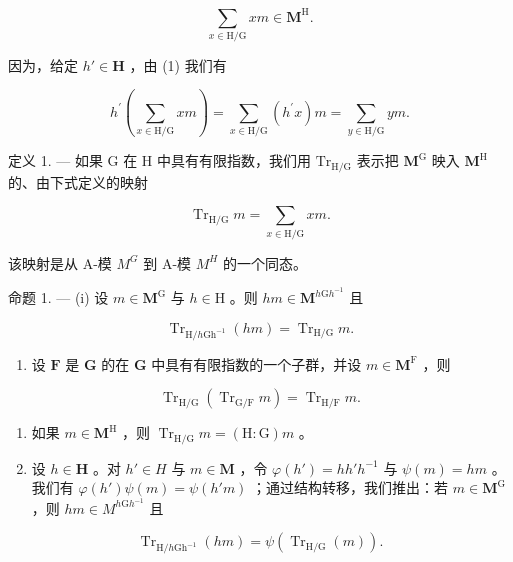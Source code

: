 \[
\sum_ {x \in \mathrm{H} / \mathrm{G}} x m \in \mathbf {M} ^ {\mathrm{H}}.\tag{2}
\]

因为，给定 \(h' \in \mathbf{H}\) ，由 (1) 我们有

\[
h ^ {\prime} \left(\sum_ {x \in \mathrm{H} / \mathrm{G}} x m\right) = \sum_ {x \in \mathrm{H} / \mathrm{G}} \left(h ^ {\prime} x\right) m = \sum_ {y \in \mathrm{H} / \mathrm{G}} y m.
\]

定义 1. --- 如果 G 在 H 中具有有限指数，我们用 \(\mathrm{Tr}_{\mathrm{H}/\mathrm{G}}\) 表示把 \(\mathbf{M}^{\mathrm{G}}\) 映入 \(\mathbf{M}^{\mathrm{H}}\) 的、由下式定义的映射

\[
\operatorname{Tr} _ {\mathrm{H} / \mathrm{G}} m = \sum_ {x \in \mathrm{H} / \mathrm{G}} x m.\tag{3}
\]

该映射是从 A-模 \(M^{G}\) 到 A-模 \(M^{H}\) 的一个同态。

命题 1. --- (i) 设 \(m \in \mathbf{M}^{\mathrm{G}}\) 与 \(h \in \mathrm{H}\) 。则 \(hm \in \mathbf{M}^{h\mathrm{G}h^{-1}}\) 且

\[
\operatorname{Tr} _ {\mathrm{H} / h \mathrm{Gh} ^ {- 1}} (h m) = \operatorname{Tr} _ {\mathrm{H} / \mathrm{G}} m.
\]

\begin{enumerate}
\def\labelenumi{(\roman{enumi})}
\setcounter{enumi}{1}
\tightlist
\item
  设 \(\mathbf{F}\) 是 \(\mathbf{G}\) 的在 \(\mathbf{G}\) 中具有有限指数的一个子群，并设 \(m \in \mathbf{M}^{\mathrm{F}}\) ，则
\end{enumerate}

\[
\operatorname{Tr} _ {\mathrm{H} / \mathrm{G}} \left(\operatorname{Tr} _ {\mathrm{G} / \mathrm{F}} m\right) = \operatorname{Tr} _ {\mathrm{H} / \mathrm{F}} m.
\]

\begin{enumerate}
\def\labelenumi{(\roman{enumi})}
\setcounter{enumi}{2}
\item
  如果 \(m \in \mathbf{M}^{\mathrm{H}}\) ，则 \(\operatorname{Tr}_{\mathrm{H} / \mathrm{G}} m = (\mathrm{H} : \mathrm{G}) m\) 。
\item
  设 \(h \in \mathbf{H}\) 。对 \(h' \in H\) 与 \(m \in \mathbf{M}\) ，令 \(\varphi(h') = hh'h^{-1}\) 与 \(\psi(m) = hm\) 。我们有 \(\varphi(h') \psi(m) = \psi(h'm)\) ；通过结构转移，我们推出：若 \(m \in \mathbf{M}^{\mathrm{G}}\) ，则 \(hm \in M^{h\mathrm{G}h^{-1}}\) 且
\end{enumerate}

\[
\operatorname{Tr} _ {\mathrm{H} / h \mathrm{Gh} ^ {- 1}} (h m) = \psi \left(\operatorname{Tr} _ {\mathrm{H} / \mathrm{G}} (m)\right).
\]


